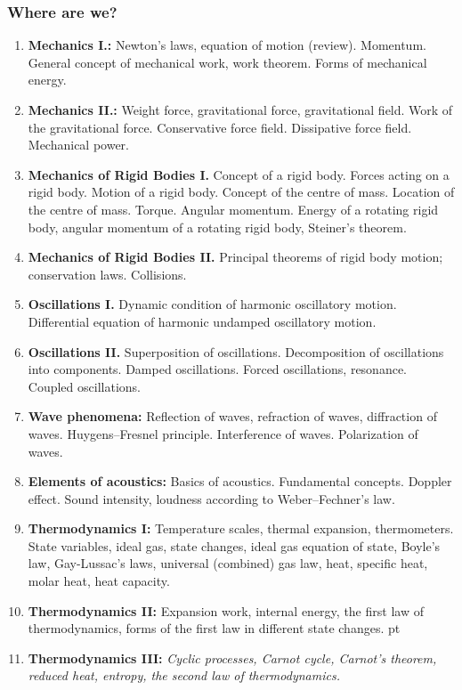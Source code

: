 \documentclass[t,aspectratio=169]{beamer}
\begin{document}
\begin{frame}
\frametitle{Where are we?}
\begin{enumerate}
\setlength{\parskip}{0pt}
\setlength{\itemsep}{0pt}
\item \textbf{Mechanics I.:} Newton’s laws, equation of motion (review). Momentum. General concept of mechanical work, work theorem. Forms of mechanical energy.
\item \textbf{Mechanics II.:} Weight force, gravitational force, gravitational field. Work of the gravitational force. Conservative force field. Dissipative force field. Mechanical power.
\item \textbf{Mechanics of Rigid Bodies I.} Concept of a rigid body. Forces acting on a rigid body. Motion of a rigid body. Concept of the centre of mass. Location of the centre of mass. Torque. Angular momentum. Energy of a rotating rigid body, angular momentum of a rotating rigid body, Steiner’s theorem.
\item \textbf{Mechanics of Rigid Bodies II.} Principal theorems of rigid body motion; conservation laws. Collisions.
\item \textbf{Oscillations I.} Dynamic condition of harmonic oscillatory motion. Differential equation of harmonic undamped oscillatory motion.
\pagebreak
\item \textbf{Oscillations II.} Superposition of oscillations. Decomposition of oscillations into components. Damped oscillations. Forced oscillations, resonance. Coupled oscillations.
\item \textbf{Wave phenomena:} Reflection of waves, refraction of waves, diffraction of waves. Huygens–Fresnel principle. Interference of waves. Polarization of waves.
\item \textbf{Elements of acoustics:} Basics of acoustics. Fundamental concepts. Doppler effect. Sound intensity, loudness according to Weber–Fechner’s law.
\item \textbf{Thermodynamics I:} Temperature scales, thermal expansion, thermometers. State variables, ideal gas, state changes, ideal gas equation of state, Boyle’s law, Gay-Lussac’s laws, universal (combined) gas law, heat, specific heat, molar heat, heat capacity.
\item \textbf{Thermodynamics II:} Expansion work, internal energy, the first law of thermodynamics, forms of the first law in different state changes.
\pagebreak
{} pt
\item \textbf{Thermodynamics III:} \textit{Cyclic processes, Carnot cycle, Carnot’s theorem, reduced heat, entropy, the second law of thermodynamics.}

\end{enumerate}
\end{frame}
\end{document}
